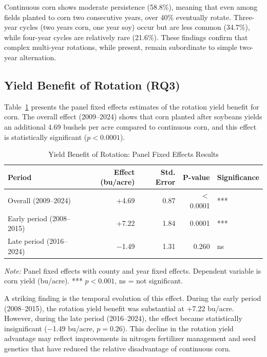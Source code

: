 \documentclass[12pt, a4paper]{article}
\begin{document}
Continuous corn shows moderate persistence (58.8\%), meaning that even among fields planted to corn two consecutive years, over 40\% eventually rotate. Three-year cycles (two years corn, one year soy) occur but are less common (34.7\%), while four-year cycles are relatively rare (21.6\%). These findings confirm that complex multi-year rotations, while present, remain subordinate to simple two-year alternation.

\subsection{Yield Benefit of Rotation (RQ3)}

Table~\ref{tab:yield_results} presents the panel fixed effects estimates of the rotation yield benefit for corn. The overall effect (2009--2024) shows that corn planted after soybeans yields an additional 4.69 bushels per acre compared to continuous corn, and this effect is statistically significant ($p < 0.0001$).

\begin{table}[H]
\centering
\caption{Yield Benefit of Rotation: Panel Fixed Effects Results}
\label{tab:yield_results}
\begin{tabular}{lrrrl}
\toprule
\textbf{Period} & \textbf{Effect (bu/acre)} & \textbf{Std. Error} & \textbf{P-value} & \textbf{Significance} \\
\midrule
Overall (2009--2024) & +4.69 & 0.87 & $<$0.0001 & *** \\
Early period (2008--2015) & +7.22 & 1.84 & 0.0001 & *** \\
Late period (2016--2024) & $-$1.49 & 1.31 & 0.260 & ns \\
\bottomrule
\end{tabular}
\vspace{0.2cm}
\small
\textit{Note:} Panel fixed effects with county and year fixed effects. Dependent variable is corn yield (bu/acre). *** $p < 0.001$, ns = not significant.
\end{table}

A striking finding is the temporal evolution of this effect. During the early period (2008--2015), the rotation yield benefit was substantial at +7.22 bu/acre. However, during the late period (2016--2024), the effect became statistically insignificant ($-$1.49 bu/acre, $p = 0.26$). This decline in the rotation yield advantage may reflect improvements in nitrogen fertilizer management and seed genetics that have reduced the relative disadvantage of continuous corn.
\end{document}
